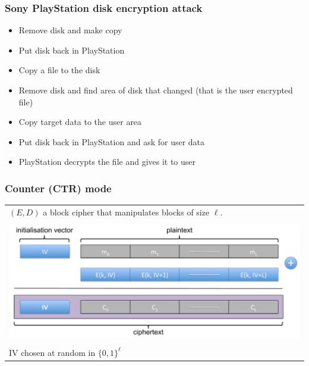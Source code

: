 \documentclass[aspectratio=169, lualatex, handout, 10pt,dvipsnames,svgnames]{beamer} %
\begin{document}
\begin{frame}
  \frametitle{Sony PlayStation disk encryption attack}
  \begin{itemize}
  \item<1-> Remove disk and make copy
  \item<2-> Put disk back in PlayStation
  \item<3-> Copy a file to the disk
  \item<4-> Remove disk and find area of disk that changed  (that is the user encrypted file)
  \item<5-> Copy target data to the user area
  \item<6-> Put disk back in PlayStation and ask for user data
  \item<7-> PlayStation decrypts the file and gives it to user
  \end{itemize}

  
\end{frame}

\begin{frame}

  \frametitle{Counter (CTR) mode}

  \bigskip{}

  \begin{tabular}{l}
    $(E, D)$ a block cipher that manipulates blocks of size $\ell$.\\
    \\
    \includegraphics[scale=0.35]{Images/CTR.pdf} \\
    \\
    IV chosen at random in $\{0, 1\}^\ell$
  \end{tabular}

\end{frame}
\end{document}
